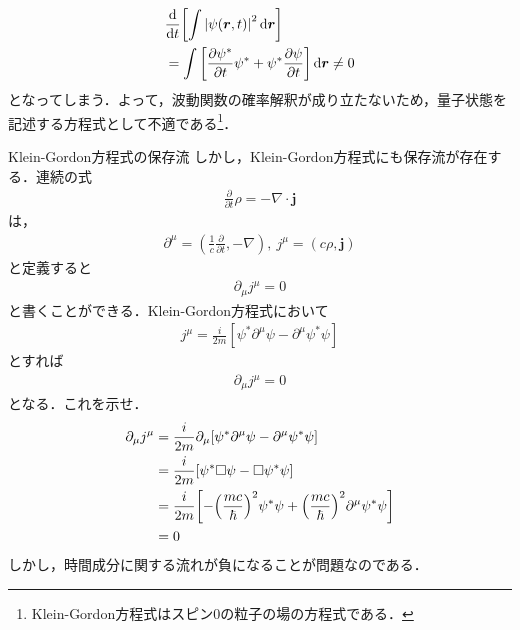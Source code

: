 \documentclass{report}
\begin{document}
    \begin{align}
      &\dv{t}\qty[\int \abs{\psi(\bm{r}, t)}^2 \dd{\bm{r}}]\\
      &= \int \qty[\pdv{\psi^*}{t}\psi^{*} + \psi^*\pdv{\psi}{t}] \dd{\bm{r}} \neq 0
    \end{align}
    となってしまう．よって，波動関数の確率解釈が成り立たないため，量子状態を記述する方程式として不適である\footnote{Klein-Gordon方程式はスピン0の粒子の場の方程式である．}．
    \begin{myexc}{Klein-Gordon方程式の保存流}{}
      しかし，Klein-Gordon方程式にも保存流が存在する．連続の式
      \begin{align}
        \frac{\partial}{\partial t}\rho = -\nabla \cdot \bm{j}
      \end{align}
      は，
      \begin{align}
        \partial^{\mu} = (\frac{1}{c}\frac{\partial}{\partial t}, -\nabla),\ j^\mu = (c\rho, \bm{j})
      \end{align}
      と定義すると
      \begin{align}
        \partial_\mu j^\mu = 0
      \end{align}
      と書くことができる．Klein-Gordon方程式において
      \begin{align}
        j^\mu = \frac{i}{2m}[\psi^{*}\partial^\mu\psi - \partial^\mu \psi^{*}\psi]
      \end{align}
      とすれば
      \begin{align}
        \partial_\mu j^\mu = 0
      \end{align}
      となる．これを示せ．
      \tcblower
      \begin{align}
        \partial_\mu j^\mu &= \frac{i}{2m}\partial_\mu[\psi^{*}\partial^\mu\psi - \partial^\mu \psi^{*}\psi]\\
        &= \frac{i}{2m}[\psi^{*}\Box\psi - \Box \psi^{*}\psi]\\
        &= \frac{i}{2m}\qty[-\qty(\frac{mc}{\hbar})^2\psi^{*}\psi + \qty(\frac{mc}{\hbar})^2 \partial^\mu \psi^{*}\psi]\\
        &= 0
      \end{align}
      しかし，時間成分に関する流れが負になることが問題なのである．
      \end{myexc}
\end{document}
